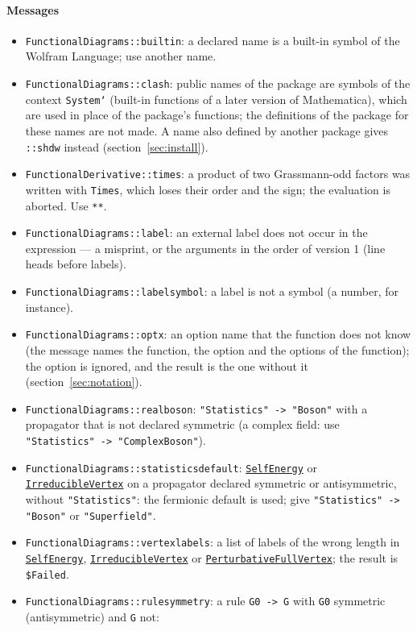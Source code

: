 \documentclass[11pt,a4paper]{article}
\newcommand{\pkg}[1]{\texttt{#1}}
\newcommand{\fnref}[1]{\hyperref[fn:#1]{\pkg{#1}}}
\newcommand{\opt}[1]{\texttt{"#1"}}
\begin{document}
\paragraph{Messages}
\begin{itemize}
\item \pkg{FunctionalDiagrams::builtin}: a declared name is a built-in symbol of the Wolfram Language; use another name.
\item \pkg{FunctionalDiagrams::clash}: public names of the package are symbols of the context \pkg{System`} (built-in
  functions of a later version of Mathematica), which are used in place of the package's functions; the definitions of
  the package for these names are not made. A name also defined by another package gives \pkg{::shdw} instead
  (section~\ref{sec:install}).
\item \pkg{FunctionalDerivative::times}: a product of two Grassmann-odd factors was written with \pkg{Times}, which
  loses their order and the sign; the evaluation is aborted. Use \pkg{**}.
\item \pkg{FunctionalDiagrams::label}: an external label does not occur in the expression --- a misprint, or the
  arguments in the order of version 1 (line heads before labels).
\item \pkg{FunctionalDiagrams::labelsymbol}: a label is not a symbol (a number, for instance).
\item \pkg{FunctionalDiagrams::optx}: an option name that the function does not know (the message names the function,
  the option and the options of the function); the option is ignored, and the result is the one without it
  (section~\ref{sec:notation}).
\item \pkg{FunctionalDiagrams::realboson}: \pkg{"Statistics" -> "Boson"} with a propagator that is not declared
  symmetric (a complex field: use \pkg{"Statistics" -> "ComplexBoson"}).
\item \pkg{FunctionalDiagrams::statisticsdefault}: \fnref{SelfEnergy} or \fnref{IrreducibleVertex} on a propagator declared
  symmetric or antisymmetric, without \opt{Statistics}: the fermionic default is used; give \pkg{"Statistics" -> "Boson"}
  or \pkg{"Superfield"}.
\item \pkg{FunctionalDiagrams::vertexlabels}: a list of labels of the wrong length in \fnref{SelfEnergy},
  \fnref{IrreducibleVertex} or \fnref{PerturbativeFullVertex}; the result is \pkg{\$Failed}.
\item \pkg{FunctionalDiagrams::rulesymmetry}: a rule \pkg{G0 -> G} with \pkg{G0} symmetric (antisymmetric) and \pkg{G} not:

\end{itemize}
\end{document}
